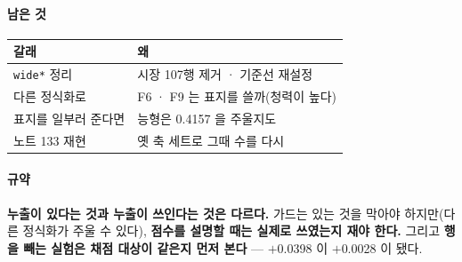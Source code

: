 \documentclass[10pt]{article}
\begin{document}
\paragraph{남은 것}
\begin{center}\small
\begin{tabular}{ll}
\hline
갈래 & 왜 \\
\hline
\texttt{wide*} 정리 & 시장 107행 제거 · 기준선 재설정 \\
다른 정식화로 & F6 · F9 는 표지를 쓸까(청력이 높다) \\
표지를 일부러 준다면 & 능형은 0.4157 을 주울지도 \\
노트 133 재현 & 옛 축 세트로 그때 수를 다시 \\
\hline
\end{tabular}
\end{center}

\paragraph{규약} \textbf{누출이 있다는 것과 누출이 쓰인다는 것은 다르다.}
가드는 있는 것을 막아야 하지만(다른 정식화가 주울 수 있다), \textbf{점수를
설명할 때는 실제로 쓰였는지 재야 한다.} 그리고 \textbf{행을 빼는 실험은
채점 대상이 같은지 먼저 본다} --- $+$0.0398 이 $+$0.0028 이 됐다.
\end{document}
